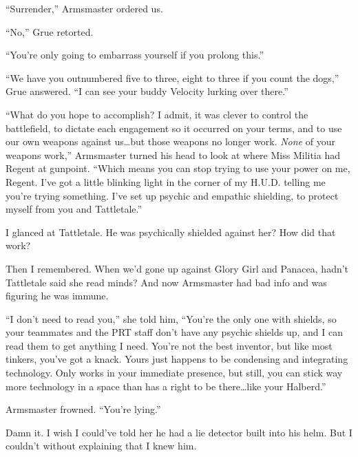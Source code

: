 





``Surrender,'' Armsmaster ordered us.



``No,'' Grue retorted.



``You're only going to embarrass yourself if you prolong this.''



``We have you outnumbered five to three, eight to three if you count the dogs,'' Grue answered.  ``I can see your buddy Velocity lurking over there.''



``What do you hope to accomplish?  I admit, it was clever to control the battlefield, to dictate each engagement so it occurred on your terms, and to use our own weapons against us\ldots but those weapons no longer work.  \emph{None} of your weapons work,'' Armsmaster turned his head to look at where Miss Militia had Regent at gunpoint.  ``Which means you can stop trying to use your power on me, Regent.  I've got a little blinking light in the corner of my H.U.D. telling me you're trying something.  I've set up psychic and empathic shielding, to protect myself from you and Tattletale.''



I glanced at Tattletale.  He was psychically shielded against her?  How did that work?



Then I remembered.  When we'd gone up against Glory Girl and Panacea, hadn't Tattletale said she read minds?  And now Armsmaster had bad info and was figuring he was immune.



``I don't need to read you,'' she told him, ``You're the only one with shields, so your teammates and the PRT staff don't have any psychic shields up, and I can read them to get anything I need.  You're not the best inventor, but like most tinkers, you've got a knack.  Yours just happens to be condensing and integrating technology.  Only works in your immediate presence, but still, you can stick way more technology in a space than has a right to be there\ldots like your Halberd.''



Armsmaster frowned.  ``You're lying.''



Damn it.  I wish I could've told her he had a lie detector built into his helm.  But I couldn't without explaining that I knew him.



